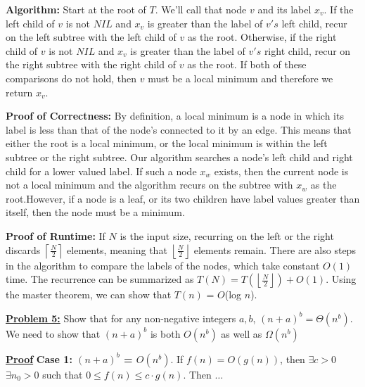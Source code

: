 \documentclass[11pt]{article}
\begin{document}
\begin{flushleft}
		\textbf{Algorithm:} Start at the root of $T$. We'll call that node $v$ and its label $x_v$. If the left child of $v$ is not $NIL$ and $x_v$ is greater than the label of $v's$ left child, recur on the left subtree with the left child of $v$ as the root. Otherwise, if the right child of $v$ is not $NIL$ and $x_v$ is greater than the label of $v's$ right child, recur on the right subtree with the right child of $v$ as the root. If both of these comparisons do not hold, then $v$ must be a local minimum and therefore we return $x_v$. 
		\newline
		
		\textbf{Proof of Correctness:} By definition, a local minimum is a node in which its label is less than that of the node's connected to it by an edge. This means that either the root is a local minimum, or the local minimum is within the left subtree or the right subtree. Our algorithm searches a node's left child and right child for a lower valued label. If such a node $x_w$ exists, then the current node is not a local minimum and the algorithm recurs on the subtree with $x_w$ as the root.\newline However, if a node is a leaf, or its two children have label values greater than itself, then the node must be a minimum.
		\newpage
		
		\textbf{Proof of Runtime:} If $N$ is the input size, recurring on the left or the right discards $\left\lceil\frac{N}{2}\right\rceil$ elements, meaning that $\left\lfloor\frac{N}{2}\right\rfloor$ elements remain. There are also steps in the algorithm to compare the labels of the nodes, which take constant $O(1)$ time. The recurrence can be summarized as $T(N) = T(\left\lfloor\frac{N}{2}\right\rfloor) + O(1)$. Using the master theorem, we can show that $T(n)$ = $O$(log $n$).
		\vspace{0.2cm}
		
		\item \textbf {\underline{Problem 5:}} Show that for any non-negative integers $a,b$,
		$(n+a)^b = \Theta(n^b).$\newline
		We need to show that $(n+a)^b$ is both $O(n^b)$ as well as $\Omega(n^b)$
		
		\textbf{\underline{Proof}}\newline
		\textbf{Case 1: $(n+a)^b$ = $O(n^b)$}. \newline
		If $f(n) = O(g(n))$, then $\exists c > 0$ $\exists n_0 > 0$ such that 
		$0 \leq f(n) \leq c \cdot g(n)$. Then $\dots$
		
		\begin{center}
		\end{center}


\end{flushleft}
\end{document}
